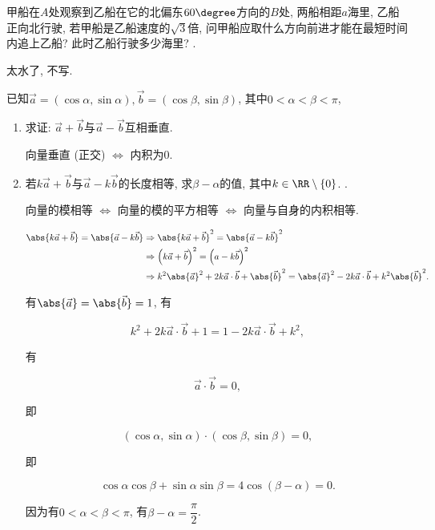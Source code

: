 \documentclass[8pt]{article}
\begin{document}
		 甲船在\(A\)处观察到乙船在它的北偏东\(60 \degree\)方向的\(B\)处, 两船相距\(a\)海里, 乙船正向北行驶, 若甲船是乙船速度的\(\sqrt{3}\)倍, 问甲船应取什么方向前进才能在最短时间内追上乙船? 此时乙船行驶多少海里? .

		 太水了, 不写.
		
		 已知\(\vec{a} = \left(\cos \alpha, \sin \alpha\right), \vec{b} = \left(\cos \beta, \sin \beta\right)\), 其中\(0 < \alpha < \beta < \pi\),
			\begin{enumerate}[label=\calword{(\arabic*)}]
				\item 求证: \(\vec{a} + \vec{b}\)与\(\vec{a} - \vec{b}\)互相垂直.
					
					 向量垂直 (正交) \(\Leftrightarrow\) 内积为\(0\).
				\item 若\(k \vec{a} + \vec{b}\)与\(\vec{a} - k\vec{b}\)的长度相等, 求\(\beta - \alpha\)的值, 其中\(k \in \RR \setminus \{0\}\). .

					 向量的模相等 \(\Leftrightarrow\) 向量的模的平方相等 \(\Leftrightarrow\) 向量与自身的内积相等.

                    \begin{align*}
                        \abs{k \vec{a} + \vec{b}} = \abs{\vec{a} - k \vec{b}} &\Rightarrow \abs{k \vec{a} + \vec{b}}^2 = \abs{\vec{a} - k \vec{b}}^2 \\
                        &\Rightarrow \left(k\vec{a} + \vec{b}\right)^2 = \left(a - k \vec{b}\right)^2\\
                        &\Rightarrow k^2 \abs{\vec{a}}^2 + 2k\vec{a} \cdot \vec{b} + \abs{\vec{b}}^2 = \abs{\vec{a}}^2 - 2k\vec{a} \cdot \vec{b} + k^2 \abs{\vec{b}}^2.
                    \end{align*}

                    有\(\abs{\vec{a}} = \abs{\vec{b}} = 1\), 有

                    \[k^2 + 2k\vec{a} \cdot \vec{b} + 1 = 1 - 2k\vec{a} \cdot \vec{b} + k^2,\]

                    有

                    \[\vec{a} \cdot \vec{b} = 0,\]

                    即

                    \[(\cos \alpha, \sin \alpha) \cdot (\cos \beta, \sin \beta) = 0,\]

                    即

                    \[\cos \alpha \cos \beta + \sin \alpha \sin \beta = 4 \cos (\beta - \alpha) = 0.\]

                    因为有\(0 < \alpha < \beta < \pi\), 有\(\beta - \alpha = \dfrac{\pi}{2}\).

			\end{enumerate}
\end{document}
